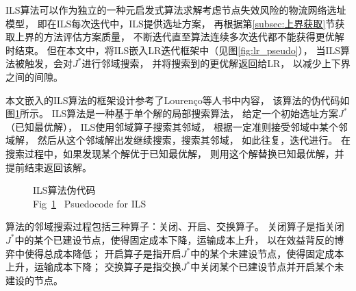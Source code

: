 ILS算法可以作为独立的一种元启发式算法求解考虑节点失效风险的物流网络选址模型，
即在ILS每次迭代中，ILS提供选址方案，
再根据第\ref{subsec:上界获取}节获取上界的方法评估方案质量，
不断迭代直至算法连续多次迭代都不能获得更优解时结束。
但在本文中，将ILS嵌入LR迭代框架中（见图\ref{fig:lr_pseudo}），
当ILS算法被触发，会对$J^*$进行邻域搜索，
并将搜索到的更优解返回给LR，
以减少上下界之间的间隙。

本文嵌入的ILS算法的框架设计参考了Lourenço\cite{ils}等人书中内容，
该算法的伪代码如图\ref{fig:ils}所示。
ILS算法是一种基于单个解的局部搜索算法，
给定一个初始选址方案$J^*$（已知最优解），
ILS使用邻域算子搜索其邻域，
根据一定准则接受邻域中某个邻域解，
然后从这个邻域解出发继续搜索，搜索其邻域，
如此往复，迭代进行。
在搜索过程中，如果发现某个解优于已知最优解，
则用这个解替换已知最优解，并提前结束返回该解。

\begin{figure}[ht] %
\setlength{\belowcaptionskip}{-0.5cm} 
  \centering
  \caption{ILS算法伪代码\\Fig~\ref{fig:ils}~ Psuedocode for ILS}
  \label{fig:ils}
\end{figure} 

算法的邻域搜索过程包括三种算子\cite{sa_lp,ts_lp}：关闭、开启、交换算子。
关闭算子是指关闭$J^*$中的某个已建设节点，使得固定成本下降，运输成本上升，
以在效益背反的博弈中使得总成本降低；
开启算子是指开启$J^*$中的某个未建设节点，使得固定成本上升，运输成本下降；
交换算子是指交换$J^*$中关闭某个已建设节点并开启某个未建设的节点。

